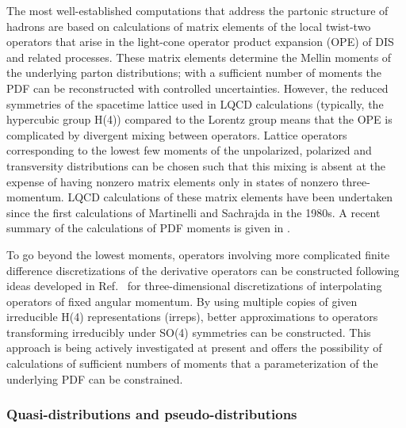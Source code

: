 The most well-established computations that address the partonic structure of hadrons are based on calculations of matrix elements of the local twist-two operators that arise in the light-cone operator product expansion (OPE) of DIS and related processes. These matrix elements determine the Mellin moments of the underlying parton distributions; with  a sufficient number of moments the PDF can be reconstructed with controlled uncertainties. However, the reduced symmetries of the spacetime lattice used in LQCD calculations (typically, the hypercubic group H(4)) compared to the Lorentz group means that the OPE is complicated by divergent mixing between operators.
Lattice operators corresponding to the lowest few moments of the unpolarized, polarized and transversity distributions can be chosen such that this mixing is absent at the expense of having nonzero matrix elements only in states of nonzero three-momentum. LQCD calculations of these matrix elements have been undertaken since the first calculations of Martinelli and Sachrajda \cite{Dawson:1997ic} in the 1980s. A recent summary of the calculations of PDF moments is given in \cite{Lin:2017snn}.
	
To go beyond the lowest moments, operators involving more complicated finite difference discretizations of the derivative operators can be constructed following ideas developed in Ref.~\cite{Davoudi:2012ya} for  three-dimensional discretizations of interpolating operators of fixed angular momentum. By using multiple copies of given irreducible H(4) representations (irreps), better approximations to operators transforming irreducibly under SO(4) symmetries can be constructed. This approach is being actively investigated at present \cite{Davoudi:2018wgb} and offers the possibility of calculations of sufficient numbers of moments that a parameterization of the underlying PDF can be constrained.



\subsubsection{Quasi-distributions and pseudo-distributions}



